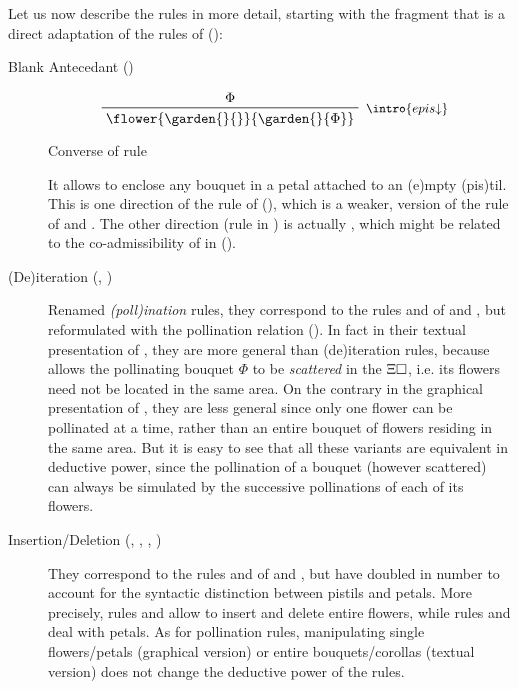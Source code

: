 \begin{scope}
Let us now describe the rules in more detail, starting with the fragment that is
a direct adaptation of the rules of  ():

\begin{description}
  \item[Blank Antecedant ()]
    
    \begin{marginfigure}
      $$
      \R[\intro{epis{\da}}]
        {\Phi}
        {\flower{\garden{{}}{{}}}{\garden{{}}{\Phi}}}
      $$
      \caption{Converse of  rule}
    \end{marginfigure}

    It allows to enclose any bouquet in a petal attached to an \textsf{(e)}mpty
    \textsf{(pis)}til. This is one direction of the rule  of
    (), which is a weaker,  version
    of the  rule  of  and . The
    other direction (rule  in ) is
    actually , which might be related to the co-admissibility of
     in  ().

  \item[(De)iteration (, )]
    Renamed \emph{\textsf{(poll)}ination} rules, they correspond to the rules
     and  of  and , but reformulated
    with the pollination relation (). In fact in their
    textual presentation of , they are more general than
    (de)iteration rules, because  allows the pollinating
    bouquet $\Phi$ to be \emph{scattered} in the  $\Xi\square$, i.e. its
    flowers need not be located in the same area. On the contrary in the
    graphical presentation of , they are less general
    since only one flower can be pollinated at a time, rather than an entire
    bouquet of flowers residing in the same area. But it is easy to see that all
    these variants are equivalent in deductive power, since the pollination of a
    bouquet (however scattered) can always be simulated by the successive
    pollinations of each of its flowers.

  \item[Insertion/Deletion (, , , )]
    They correspond to the rules  and  of  and
    , but have doubled in number to account for the syntactic
    distinction between pistils and petals. More precisely, rules  and
     allow to insert and delete entire flowers, while rules 
    and  deal with petals. As for pollination rules, manipulating
    single flowers/petals (graphical version) or entire bouquets/corollas
    (textual version) does not change the deductive power of the rules.
    

\end{description}
\end{scope}
